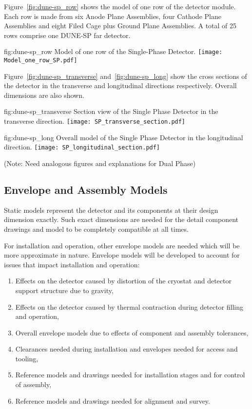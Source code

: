 Figure~\ref{fig:dune-sp_row} shows the model of one row of the
detector module. Each row is made from six Anode Plane Assemblies,
four Cathode Plane Assemblies and eight Filed Cage plus Ground Plane
Assemblies. A total of 25 rows comprise one DUNE-SP far detector.
\begin{dunefigure}{fig:dune-sp_row}
  {Model of one row of the Single-Phase Detector.}
  \texttt{[image: Model\_one\_row\_SP.pdf]}
\end{dunefigure}


Figure~\ref{fig:dune-sp_transverse} and~\ref{fig:dune-sp_long} show
the cross sections of the detector in the transverse and longitudinal
directions respectively. Overall dimensions are also shown.
\begin{dunefigure}{fig:dune-sp_transverse}
  {Section view of the Single Phase Detector in the transverse direction.}
  \texttt{[image: SP\_transverse\_section.pdf]}
\end{dunefigure}
\begin{dunefigure}{fig:dune-sp_long}
  {Overall model of the Single Phase Detector in the longitudinal direction.}
  \texttt{[image: SP\_longitudinal\_section.pdf]}
\end{dunefigure}

(Note: Need analogous figures and explanations for Dual Phase)

\subsection{Envelope and Assembly Models}
\label{sec:fdsp-coord-integ-envelope}
Static models represent the detector and its components at their
design dimension exactly. Such exact dimensions are needed for the
detail component drawings and model to be completely compatible at all
times.

For installation and operation, other envelope models are needed which
will be more approximate in nature. Envelope models will be developed
to account for issues that impact installation and operation:
\begin{enumerate}
 \item Effects on the detector caused by distortion of the cryostat
   and detector support structure due to gravity,
 \item Effects on the detector caused by thermal contraction during
   detector filling and operation,
 \item Overall envelope models due to effects of component and
   assembly tolerances,
 \item Clearances needed during installation and envelopes needed for
   access and tooling,
 \item Reference models and drawings needed for installation stages
   and for control of assembly,
 \item Reference models and drawings needed for alignment and survey.
\end{enumerate}


